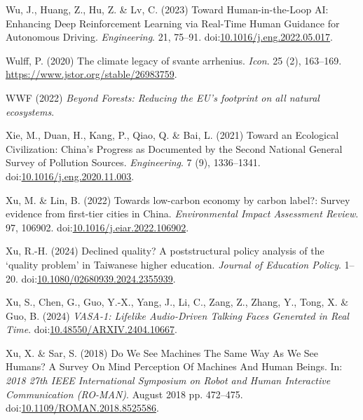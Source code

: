 \documentclass[
  letterpaper,
  DIV=11,
  numbers=noendperiod]{scrartcl}
\newlength{\cslhangindent}
\newenvironment{CSLReferences}[2] %
 {\begin{list}{}{%
  \setlength{\itemindent}{0pt}
  \setlength{\leftmargin}{0pt}
  \setlength{\parsep}{0pt}
  \ifodd #1
   \setlength{\leftmargin}{\cslhangindent}
   \setlength{\itemindent}{-1\cslhangindent}
  \fi
  \setlength{\itemsep}{#2\baselineskip}}}
 {\end{list}}
\begin{document}
\begin{CSLReferences}{0}{1}
Wu, J., Huang, Z., Hu, Z. \& Lv, C. (2023) Toward {Human-in-the-Loop
AI}: {Enhancing Deep Reinforcement Learning} via {Real-Time Human
Guidance} for {Autonomous Driving}. \emph{Engineering}. 21, 75--91.
doi:\href{https://doi.org/10.1016/j.eng.2022.05.017}{10.1016/j.eng.2022.05.017}.

Wulff, P. (2020) The climate legacy of svante arrhenius. \emph{Icon}. 25
(2), 163--169. \url{https://www.jstor.org/stable/26983759}.

WWF (2022) \emph{Beyond {Forests}: {Reducing} the {EU}'s footprint on
all natural ecosystems}.

Xie, M., Duan, H., Kang, P., Qiao, Q. \& Bai, L. (2021) Toward an
{Ecological Civilization}: {China}'s {Progress} as {Documented} by the
{Second National General Survey} of {Pollution Sources}.
\emph{Engineering}. 7 (9), 1336--1341.
doi:\href{https://doi.org/10.1016/j.eng.2020.11.003}{10.1016/j.eng.2020.11.003}.

Xu, M. \& Lin, B. (2022) Towards low-carbon economy by carbon label?:
{Survey} evidence from first-tier cities in {China}. \emph{Environmental
Impact Assessment Review}. 97, 106902.
doi:\href{https://doi.org/10.1016/j.eiar.2022.106902}{10.1016/j.eiar.2022.106902}.

Xu, R.-H. (2024) Declined quality? {A} poststructural policy analysis of
the {`quality problem'} in {Taiwanese} higher education. \emph{Journal
of Education Policy}. 1--20.
doi:\href{https://doi.org/10.1080/02680939.2024.2355939}{10.1080/02680939.2024.2355939}.

Xu, S., Chen, G., Guo, Y.-X., Yang, J., Li, C., Zang, Z., Zhang, Y.,
Tong, X. \& Guo, B. (2024) \emph{{VASA-1}: {Lifelike Audio-Driven
Talking Faces Generated} in {Real Time}}.
doi:\href{https://doi.org/10.48550/ARXIV.2404.10667}{10.48550/ARXIV.2404.10667}.

Xu, X. \& Sar, S. (2018) Do {We See Machines The Same Way As We See
Humans}? {A Survey On Mind Perception Of Machines And Human Beings}. In:
\emph{2018 27th {IEEE International Symposium} on {Robot} and {Human
Interactive Communication} ({RO-MAN})}. August 2018 pp. 472--475.
doi:\href{https://doi.org/10.1109/ROMAN.2018.8525586}{10.1109/ROMAN.2018.8525586}.


\end{CSLReferences}
\end{document}
